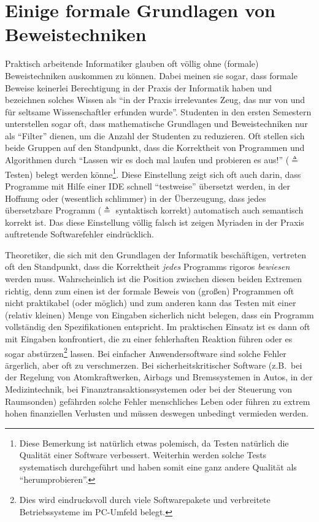  \section{Einige
formale Grundlagen von Beweistechniken} \label{sec:proof} Praktisch
arbeitende Informatiker glauben oft völlig ohne (formale)
Beweistechniken auskommen zu können. Dabei meinen sie sogar, dass
formale Beweise keinerlei Berechtigung in der Praxis der Informatik
haben und bezeichnen solches Wissen als "`in der Praxis irrelevantes
Zeug, das nur von und für seltsame Wissenschaftler erfunden
wurde"'. Studenten in den ersten Semestern unterstellen sogar oft,
dass mathematische Grundlagen und Beweistechniken nur als "`Filter"'
dienen, um die Anzahl der Studenten zu reduzieren. Oft stellen sich
beide Gruppen auf den Standpunkt, dass die Korrektheit von Programmen
und Algorithmen durch "`Lassen wir es doch mal laufen und probieren es
aus!"' ($\triangleq$ Testen) belegt werden könne\footnote{Diese
Bemerkung ist natürlich etwas polemisch, da Testen natürlich die
Qualität einer Software verbessert. Weiterhin werden solche Tests
systematisch durchgeführt und haben somit eine ganz andere Qualität als
"`herumprobieren"'.}. Diese Einstellung zeigt sich oft auch darin,
dass Programme mit Hilfe einer IDE schnell "`testweise"' übersetzt
werden, in der Hoffnung oder (wesentlich schlimmer) in der
Überzeugung, dass jedes übersetzbare Programm ($\triangleq$
syntaktisch korrekt) automatisch auch semantisch korrekt ist. Das
diese Einstellung völlig falsch ist zeigen Myriaden in der Praxis
auftretende Softwarefehler eindrücklich.

Theoretiker, die sich mit den Grundlagen der Informatik beschäftigen,
vertreten oft den Standpunkt, dass die Korrektheit \emph{jedes}
Programms rigoros \emph{bewiesen} werden muss. Wahrscheinlich ist die
Position zwischen diesen beiden Extremen richtig, denn zum einen ist
der formale Beweis von (großen) Programmen oft nicht praktikabel (oder
möglich) und zum anderen kann das Testen mit einer (relativ kleinen)
Menge von Eingaben sicherlich nicht belegen, dass ein Programm
vollständig den Spezifikationen entspricht. Im praktischen Einsatz ist
es dann oft mit Eingaben konfrontiert, die zu einer fehlerhaften
Reaktion führen oder es sogar abstürzen\footnote{Dies wird
eindrucksvoll durch viele Softwarepakete und verbreitete
Betriebssysteme im PC-Umfeld belegt.} lassen. Bei einfacher
Anwendersoftware sind solche Fehler ärgerlich, aber oft zu
verschmerzen. Bei sicherheitskritischer Software (z.B.~bei der
Regelung von Atomkraftwerken, Airbags und Bremssystemen in Autos, in
der Medizintechnik, bei Finanztransaktionssystemen oder bei der 
Steuerung von Raumsonden) gefährden solche Fehler menschliches 
Leben oder führen zu extrem hohen finanziellen Verlusten und müssen 
deswegen unbedingt vermieden werden.

